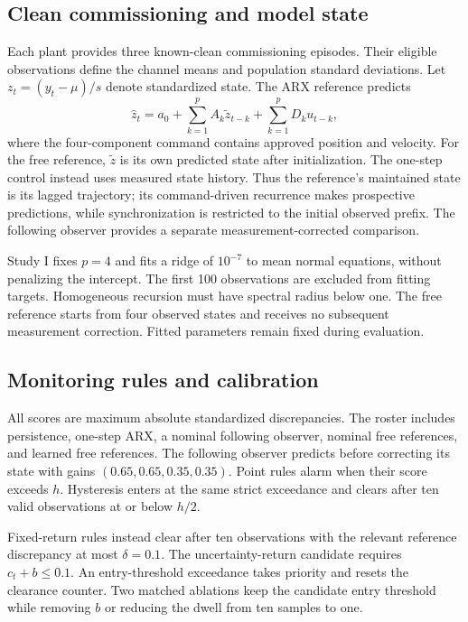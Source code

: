 \documentclass[11pt]{article}
\begin{document}
\subsection{Clean commissioning and model state}
Each plant provides three known-clean commissioning episodes. Their eligible observations define the channel means and population standard deviations. Let $z_t=(y_t-\mu)/s$ denote standardized state. The ARX reference predicts
\begin{equation}
 \widehat z_t=a_0+\sum_{k=1}^{p}A_k\widetilde z_{t-k}
                    +\sum_{k=1}^{p}D_k u_{t-k},
 \label{eq:arx}
\end{equation}
where the four-component command contains approved position and velocity. For the free reference, $\widetilde z$ is its own predicted state after initialization. The one-step control instead uses measured state history. Thus the reference's maintained state is its lagged trajectory; its command-driven recurrence makes prospective predictions, while synchronization is restricted to the initial observed prefix. The following observer provides a separate measurement-corrected comparison.

Study I fixes $p=4$ and fits a ridge of $10^{-7}$ to mean normal equations, without penalizing the intercept. The first 100 observations are excluded from fitting targets. Homogeneous recursion must have spectral radius below one. The free reference starts from four observed states and receives no subsequent measurement correction. Fitted parameters remain fixed during evaluation.

\subsection{Monitoring rules and calibration}
All scores are maximum absolute standardized discrepancies. The roster includes persistence, one-step ARX, a nominal following observer, nominal free references, and learned free references. The following observer predicts before correcting its state with gains $(0.65,0.65,0.35,0.35)$. Point rules alarm when their score exceeds $h$. Hysteresis enters at the same strict exceedance and clears after ten valid observations at or below $h/2$.

Fixed-return rules instead clear after ten observations with the relevant reference discrepancy at most $\delta=0.1$. The uncertainty-return candidate requires $c_t+b\le0.1$. An entry-threshold exceedance takes priority and resets the clearance counter. Two matched ablations keep the candidate entry threshold while removing $b$ or reducing the dwell from ten samples to one.
\end{document}
